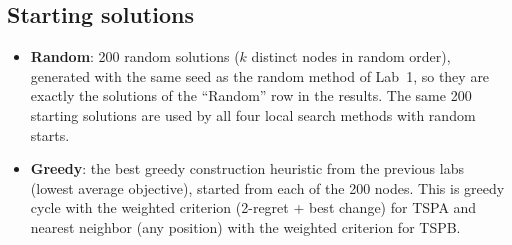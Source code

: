 \documentclass[11pt,a4paper]{article}
\begin{document}
\subsection*{Starting solutions}
\begin{itemize}
  \item \textbf{Random}: 200 random solutions ($k$ distinct nodes in random order), generated with
        the same seed as the random method of Lab~1, so they are exactly the solutions of the
        ``Random'' row in the results. The same 200 starting solutions are used by all four
        local search methods with random starts.
  \item \textbf{Greedy}: the best greedy construction heuristic from the previous labs (lowest
        average objective), started from each of the 200 nodes. This is
        greedy cycle with the weighted criterion (2-regret + best change) for TSPA and
        nearest neighbor (any position) with the weighted criterion for TSPB.
\end{itemize}

\end{document}
